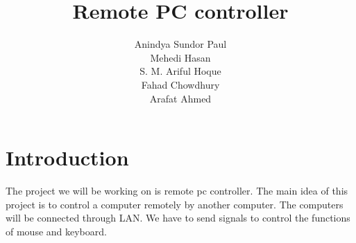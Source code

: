 \documentclass{article}
\title{Remote PC controller}
\author{Anindya Sundor Paul \\ Mehedi Hasan \\ S. M. Ariful Hoque \\ Fahad Chowdhury \\ Arafat Ahmed}
\date{ }
\begin{document}
 
\maketitle

\newpage
 
\tableofcontents

\newpage
 
\section{Introduction}

The project we will be working on is remote pc controller. The main idea of this project is to control a computer remotely by another computer. The computers will be connected through LAN. We have to send signals to control the functions of mouse and keyboard. \\

 
\end{document}
